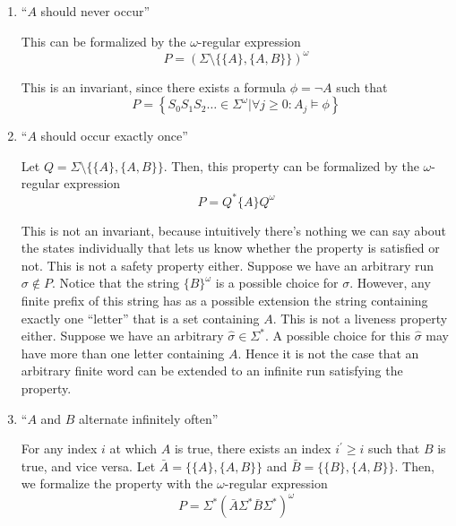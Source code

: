 \documentclass[letterpaper,11pt]{article}
\newcommand{\enumalpha}{\renewcommand\labelenumi{(\alph{enumi})}}
\begin{document}
\begin{enumerate}
        \enumalpha
    \item ``$A$ should never occur''

        This can be formalized by the $\omega$-regular expression
        \begin{equation*}
            P = (\Sigma \setminus \{ \{A\}, \{A, B\} \})^\omega
        \end{equation*}

        This is an invariant, since there exists a formula $\phi = \neg A$ such
        that
        \begin{equation*}
            P = \left\{
                S_0 S_1 S_2 \ldots \in \Sigma^\omega
                | \forall j \geq 0 : A_j \models \phi
            \right\}
        \end{equation*}

    \item ``$A$ should occur exactly once''

        Let $Q = \Sigma \setminus \{ \{A\}, \{A, B\} \}$. Then, this property
        can be formalized by the $\omega$-regular expression
        \begin{equation*}
            P = Q^* \{A\} Q^\omega
        \end{equation*}

        This is not an invariant, because intuitively there's nothing we can
        say about the states individually that lets us know whether the
        property is satisfied or not. This is not a safety property either.
        Suppose we have an arbitrary run $\sigma \notin P$. Notice that the
        string $\{B\}^\omega$ is a possible choice for $\sigma$. However, any
        finite prefix of this string has as a possible extension the string
        containing exactly one ``letter'' that is a set containing $A$. This is
        not a liveness property either. Suppose we have an arbitrary
        $\hat \sigma \in \Sigma^*$. A possible choice for this $\hat \sigma$
        may have more than one letter containing $A$. Hence it is not the case
        that an arbitrary finite word can be extended to an infinite run
        satisfying the property.

    \item ``$A$ and $B$ alternate infinitely often''

        For any index $i$ at which $A$ is true, there exists an index
        $i^\prime \geq i$ such that $B$ is true, and vice versa.
        Let $\bar A = \{ \{A\}, \{A, B\} \}$
        and $\bar B = \{ \{B\}, \{A, B\} \}$.
        Then, we formalize the property with the $\omega$-regular expression
        \begin{equation*}
            P = \Sigma^* (\bar A \Sigma^* \bar B \Sigma^*)^\omega
        \end{equation*}


\end{enumerate}
\end{document}
